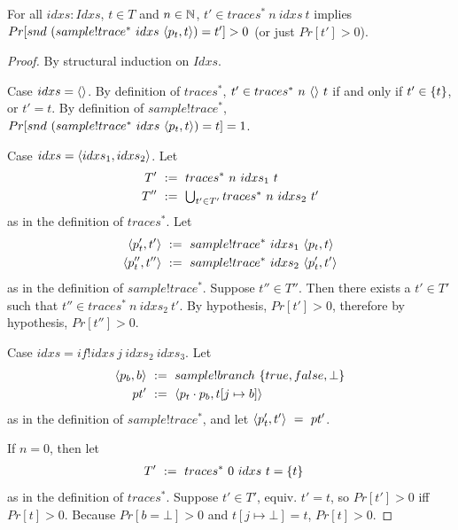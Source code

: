 \begin{theorem}
For all $idxs : Idxs$, $t \in T$ and $n \in \mathbb{N}$, $t' \in traces^*~n~idxs~t$ implies $Pr[snd~(sample!trace^*~idxs~\langle{p_t,t}\rangle) = t'] > 0$ (or just $Pr[t'] > 0$).
\end{theorem}
\begin{proof}
By structural induction on $Idxs$.

Case $idxs = \langle{}\rangle$.
By definition of $traces^*$, $t' \in traces^*~n~\langle{}\rangle~t$ if and only if $t' \in \{{t}\}$, or $t' = t$.
By definition of $sample!trace^*$, $Pr[snd~(sample!trace^*~idxs~\langle{p_t,t}\rangle) = t] = 1$.

Case $idxs = \langle{idxs_1,idxs_2}\rangle$.
Let
\begin{equation}
\begin{aligned}
	T'&\ :=\ traces^*~n~idxs_1~t \\
	T''&\ :=\ \textstyle\bigcup_{t' \in T'} traces^*~n~idxs_2~t'
\end{aligned}
\end{equation}
as in the definition of $traces^*$. Let
\begin{equation}
\begin{aligned}
	\langle{p_t',t'}\rangle&\ :=\ sample!trace^*~idxs_1~\langle{p_t,t}\rangle \\
	\langle{p_t'',t''}\rangle&\ :=\ sample!trace^*~idxs_2~\langle{p_t',t'}\rangle
\end{aligned}
\end{equation}
as in the definition of $sample!trace^*$.
Suppose $t'' \in T''$.
Then there exists a $t' \in T'$ such that $t'' \in traces^*~n~idxs_2~t'$.
By hypothesis, $Pr[t'] > 0$, therefore by hypothesis, $Pr[t''] > 0$.

Case $idxs = if!idxs~j~idxs_2~idxs_3$.
Let
\begin{equation}
\begin{aligned}
	\langle{p_b,b}\rangle&\ :=\ sample!branch~\{{true,false,\bot}\} \\
	pt' &\ :=\ \langle{p_t \cdot p_b, t[j \mapsto b]}\rangle
\end{aligned}
\end{equation}
as in the definition of $sample!trace^*$, and let $\langle{p_t',t'}\rangle\ =\ pt'$.

If $n = 0$, then let
\begin{equation}
\begin{aligned}
	T'&\ :=\ traces^*~0~idxs~t = \{{t}\}
\end{aligned}
\end{equation}
as in the definition of $traces^*$.
Suppose $t' \in T'$, equiv. $t' = t$, so $Pr[t'] > 0$ iff $Pr[t] > 0$.
Because $Pr[b = \bot] > 0$ and $t[j \mapsto \bot] = t$, $Pr[t] > 0$.


\end{proof}
